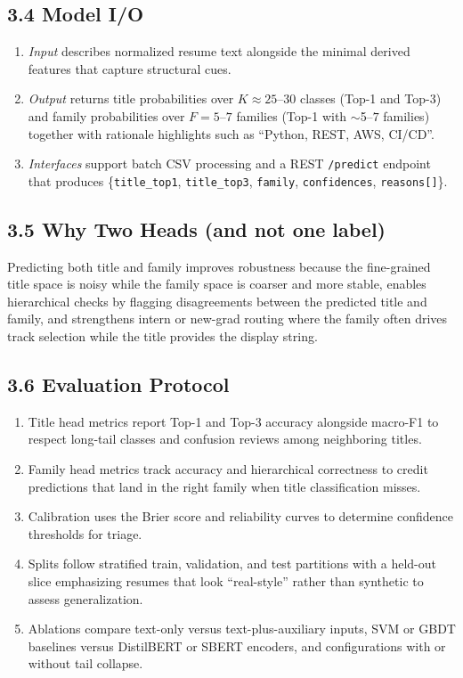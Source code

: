 \documentclass[12pt]{article}
\begin{document}
\subsection*{3.4 Model I/O}
\begin{enumerate}
  \item \textit{Input} describes normalized resume text alongside the minimal derived features that capture structural cues.
  \item \textit{Output} returns title probabilities over $K\approx25$--$30$ classes (Top-1 and Top-3) and family probabilities over $F = 5$--$7$ families (Top-1 with $\sim$5--$7$ families) together with rationale highlights such as ``Python, REST, AWS, CI/CD''.
  \item \textit{Interfaces} support batch CSV processing and a REST \texttt{/predict} endpoint that produces \{\texttt{title\_top1}, \texttt{title\_top3}, \texttt{family}, \texttt{confidences}, \texttt{reasons[]}\}.
\end{enumerate}

\medskip

\subsection*{3.5 Why Two Heads (and not one label)}
Predicting both title and family improves robustness because the fine-grained title space is noisy while the family space is coarser and more stable, enables hierarchical checks by flagging disagreements between the predicted title and family, and strengthens intern or new-grad routing where the family often drives track selection while the title provides the display string.

\medskip

\subsection*{3.6 Evaluation Protocol}
\begin{enumerate}
  \item Title head metrics report Top-1 and Top-3 accuracy alongside macro-F1 to respect long-tail classes and confusion reviews among neighboring titles.
  \item Family head metrics track accuracy and hierarchical correctness to credit predictions that land in the right family when title classification misses.
  \item Calibration uses the Brier score and reliability curves to determine confidence thresholds for triage.
  \item Splits follow stratified train, validation, and test partitions with a held-out slice emphasizing resumes that look ``real-style'' rather than synthetic to assess generalization.
  \item Ablations compare text-only versus text-plus-auxiliary inputs, SVM or GBDT baselines versus DistilBERT or SBERT encoders, and configurations with or without tail collapse.
\end{enumerate}
\end{document}
